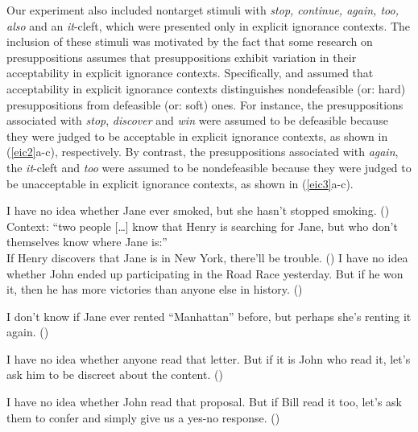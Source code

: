 \documentclass[11pt,fleqn]{article}
\def\verymarginal{{\leavevmode\llap{??}}}
\def\infelic{{\leavevmode\llap{\#}}}
\newcommand{\6}{\mbox{$[\hspace*{-.6mm}[$}}
\newcommand{\9}{\mbox{$]\hspace*{-.6mm}]$}}
\begin{document}
Our experiment also included nontarget stimuli with \emph{stop, continue, again, too, also} and an {\em it}-cleft, which were presented only in explicit ignorance contexts. The inclusion of these stimuli was motivated by the fact that some research on presuppositions assumes that presuppositions exhibit variation in their acceptability in explicit ignorance contexts. Specifically, \citealt{simons01} and \citealt{abusch10} assumed that acceptability in explicit ignorance contexts distinguishes nondefeasible (or: hard) presuppositions from defeasible (or: soft) ones. For instance, the presuppositions associated with \emph{stop}, \emph{discover} and \emph{win} were assumed to be defeasible because they were judged to be acceptable in explicit ignorance contexts, as shown in (\ref{eic2}a-c), respectively. By contrast, the presuppositions associated with \emph{again}, the \emph{it}-cleft and \emph{too} were assumed to be nondefeasible because they were judged to be unacceptable in explicit ignorance contexts, as shown in (\ref{eic3}a-c).

\begin{exe}
\ex\label{eic2}
\begin{xlist}
\ex I have no idea whether Jane ever smoked, but she hasn't stopped smoking. \hfill (\citealt[443]{simons01})
\ex Context: ``two people [\ldots] know that Henry is searching for Jane, but who don't themselves know where Jane is:'' \\ If Henry discovers that Jane is in New York, there'll be trouble. \hfill (\citealt[434]{simons01})
\ex I have no idea whether John ended up participating in the
Road Race yesterday. But if he won it, then he has more victories than anyone else in history. \hfill (\citealt[39]{abusch10})
\end{xlist}
\ex\label{eic3}
\begin{xlist}
\ex\infelic I don't know if Jane ever rented ``Manhattan'' before, but perhaps she's renting it again. \hfill (\citealt[443]{simons01})

\ex \verymarginal I have no idea whether anyone read that letter. But if it is John
who read it, let's ask him to be discreet about the content. \hfill (\citealt[40]{abusch10})

\ex \verymarginal I have no idea whether John read that proposal. But if Bill read it too, let's ask them to confer and simply give us a yes-no response. \hfill (\citealt[40]{abusch10})
\end{xlist}
\end{exe}
\end{document}
